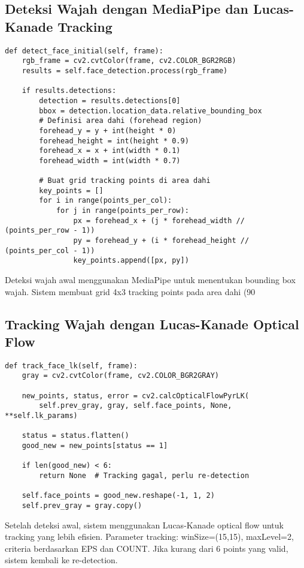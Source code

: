 \documentclass[11pt,a4paper]{article}
\begin{document}
\subsection{Deteksi Wajah dengan MediaPipe dan Lucas-Kanade Tracking}
    \begin{lstlisting}
def detect_face_initial(self, frame):
    rgb_frame = cv2.cvtColor(frame, cv2.COLOR_BGR2RGB)
    results = self.face_detection.process(rgb_frame)
    
    if results.detections:
        detection = results.detections[0]
        bbox = detection.location_data.relative_bounding_box
        # Definisi area dahi (forehead region)
        forehead_y = y + int(height * 0)
        forehead_height = int(height * 0.9)
        forehead_x = x + int(width * 0.1)
        forehead_width = int(width * 0.7)
        
        # Buat grid tracking points di area dahi
        key_points = []
        for i in range(points_per_col):
            for j in range(points_per_row):
                px = forehead_x + (j * forehead_width // (points_per_row - 1))
                py = forehead_y + (i * forehead_height // (points_per_col - 1))
                key_points.append([px, py])
    \end{lstlisting}
    Deteksi wajah awal menggunakan MediaPipe untuk menentukan bounding box wajah. Sistem membuat grid 4x3 tracking points pada area dahi (90%

\subsection{Tracking Wajah dengan Lucas-Kanade Optical Flow}
    \begin{lstlisting}
def track_face_lk(self, frame):
    gray = cv2.cvtColor(frame, cv2.COLOR_BGR2GRAY)
    
    new_points, status, error = cv2.calcOpticalFlowPyrLK(
        self.prev_gray, gray, self.face_points, None, **self.lk_params)
    
    status = status.flatten()
    good_new = new_points[status == 1]
    
    if len(good_new) < 6:
        return None  # Tracking gagal, perlu re-detection
        
    self.face_points = good_new.reshape(-1, 1, 2)
    self.prev_gray = gray.copy()
    \end{lstlisting}
    Setelah deteksi awal, sistem menggunakan Lucas-Kanade optical flow untuk tracking yang lebih efisien. Parameter tracking: winSize=(15,15), maxLevel=2, criteria berdasarkan EPS dan COUNT. Jika kurang dari 6 points yang valid, sistem kembali ke re-detection.
\end{document}
